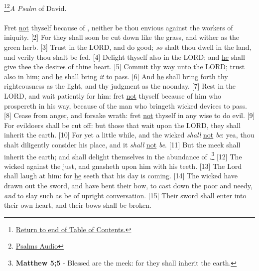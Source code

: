 \footnote{\textcolor[cmyk]{0.99998,1,0,0}{\hyperlink{TOC}{Return to end of Table of Contents.}}}\footnote{\href{https://www.audioverse.org/english/audiobibles/books/ENGKJV/O/Ps/1}{\textcolor[cmyk]{0.99998,1,0,0}{Psalms Audio}}}\textcolor[cmyk]{0.99998,1,0,0}{\emph{A Psalm} of David.}\\
\\
\textcolor[cmyk]{0.99998,1,0,0}{Fret \underline{not} thyself because of , neither be thou envious against the workers of iniquity.}
[2] \textcolor[cmyk]{0.99998,1,0,0}{For they shall soon be cut down like the grass, and wither as the green herb.}
[3] \textcolor[cmyk]{0.99998,1,0,0}{Trust in the LORD, and do good; \emph{so} shalt thou dwell in the land, and verily thou shalt be fed.}
[4] \textcolor[cmyk]{0.99998,1,0,0}{Delight thyself also in the LORD; and \underline{he} shall give thee the desires of thine heart.}
[5] \textcolor[cmyk]{0.99998,1,0,0}{Commit thy way unto the LORD; trust also in him; and \underline{he} shall bring \emph{it} to pass.}
[6] \textcolor[cmyk]{0.99998,1,0,0}{And \underline{he} shall bring forth thy righteousness as the light, and thy judgment as the noonday.}
[7] \textcolor[cmyk]{0.99998,1,0,0}{Rest in the LORD, and wait patiently for him: fret \underline{not} thyself because of him who prospereth in his way, because of the man who bringeth wicked devices to pass.}
[8] \textcolor[cmyk]{0.99998,1,0,0}{Cease from anger, and forsake wrath: fret \underline{not} thyself in any wise to do evil.}
[9] \textcolor[cmyk]{0.99998,1,0,0}{For evildoers shall be cut off: but those that wait upon the LORD, they shall inherit the earth.}
[10] \textcolor[cmyk]{0.99998,1,0,0}{For yet a little while, and the wicked \emph{shall} \underline{not} \emph{be}: yea, thou shalt diligently consider his place, and it \emph{shall} \underline{not} \emph{be}.}
[11] \textcolor[cmyk]{0.99998,1,0,0}{But the meek shall inherit the earth; and shall delight themselves in the abundance of .}\footnote{\textbf{Matthew 5;5} - Blessed are the meek: for they shall inherit the earth.}
[12] \textcolor[cmyk]{0.99998,1,0,0}{The wicked  against the just, and gnasheth upon him with his teeth.}
[13] \textcolor[cmyk]{0.99998,1,0,0}{The Lord shall laugh at him: for \underline{he} seeth that his day is coming.}
[14] \textcolor[cmyk]{0.99998,1,0,0}{The wicked have drawn out the sword, and have bent their bow, to cast down the poor and needy, \emph{and} to slay such as be of upright conversation.}
[15] \textcolor[cmyk]{0.99998,1,0,0}{Their sword shall enter into their own heart, and their bows shall be broken.}
